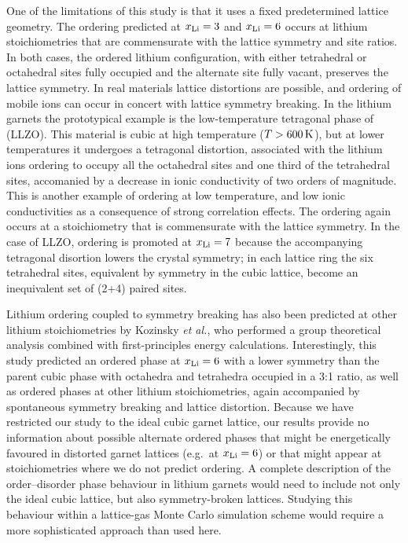 \documentclass[aps,prb,twocolumn,superscriptaddress,reprint]{revtex4-1}
\newcommand{\xLi}{x_\m{Li}}
\begin{document}
One of the limitations of this study is that it uses a fixed predetermined lattice geometry. The ordering predicted at $\xLi=3$ and $\xLi=6$ occurs at  lithium stoichiometries that are commensurate with the lattice symmetry and site ratios. In both cases, the ordered lithium configuration, with either tetrahedral or octahedral sites fully occupied and the alternate site fully vacant, preserves the lattice symmetry. In real materials lattice distortions are possible, and ordering of mobile ions can occur in concert with lattice symmetry breaking. In the lithium garnets the prototypical example is the low-temperature tetragonal phase of  (LLZO).\cite{BernsteinEtAl_PhysRevLett2012,AwakaEtAl_ChemLett2011} This material is cubic at high temperature ($T>600\,\mathrm{K}$), but at lower temperatures it undergoes a tetragonal distortion, associated with the lithium ions ordering to occupy all the octahedral sites and one third of the tetrahedral sites, accomanied by a decrease in ionic conductivity of two orders of magnitude. This is another example of ordering at low temperature, and low ionic conductivities as a consequence of strong correlation effects.\cite{BurbanoEtAl_PhysRevLett2016} The ordering again occurs at a stoichiometry that is commensurate with the lattice symmetry. In the case of LLZO, ordering is promoted at $\xLi=7$ because the accompanying tetragonal disortion lowers the crystal symmetry; in each lattice ring the six tetrahedral sites, equivalent by symmetry in the cubic lattice, become an inequivalent set of (2+4) paired sites. 

Lithium ordering coupled to symmetry breaking has also been predicted at other lithium stoichiometries by Kozinsky \emph{et al.},\cite{KozinskyEtAl_PhysRevLett2016} who performed a group theoretical analysis combined with first-principles energy calculations. Interestingly, this study predicted an ordered phase at $\xLi=6$ with a lower symmetry than the parent cubic phase with octahedra and tetrahedra occupied in a 3:1 ratio, as well as ordered phases at other lithium stoichiometries, again accompanied by spontaneous symmetry breaking and lattice distortion. Because we have restricted our study to the ideal cubic garnet lattice, our results provide no information about possible alternate ordered phases that might be  energetically favoured in distorted garnet lattices (e.g.\ at $\xLi=6$) or that might appear at stoichiometries where we do not predict ordering. A complete description of the order--disorder phase behaviour in lithium garnets would need to include not only the ideal cubic lattice, but also symmetry-broken lattices. Studying this behaviour within a lattice-gas Monte Carlo simulation scheme would require a more sophisticated approach than used here.
\end{document}
